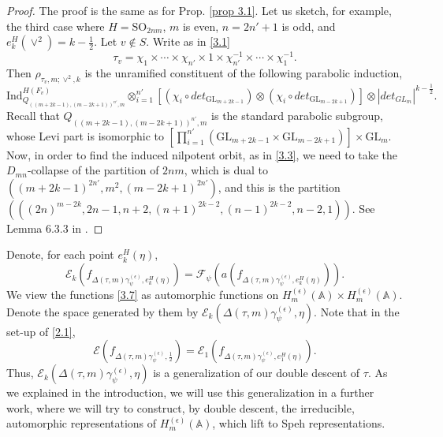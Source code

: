 \documentclass[12pts]{amsart}
\newcommand{\BA}{{\mathbb {A}}}
\newcommand{\GL}{{\mathrm{GL}}}
\newcommand{\Ind}{{\mathrm{Ind}}}
\newcommand{\SO}{{\mathrm{SO}}}
\begin{document}
\begin{proof}
The proof is the same as for Prop. \ref{prop 3.1}. Let us sketch, for example, the third case where $H=\SO_{2nm}$, $m$ is even, $n=2n'+1$ is odd, and $e_k^H(\vee^2)=k-\frac{1}{2}$. Let $v\notin S$. Write as in \eqref{3.1}
\begin{equation}\label{3.5}
\tau_v=\chi_1\times\cdots\times \chi_{n'}\times 1\times\chi^{-1}_{n'}\times\cdots\times\chi^{-1}_1.
\end{equation}
Then $\rho_{\tau_v,m;\vee^2,k}$ is the unramified constituent of the following parabolic induction, 
\begin{equation}\label{3.6}
\Ind^{H(F_v)}_{Q_{((m+2k-1),(m-2k+1))^{n'},m}}\otimes_{i=1}^{n'}[(\chi_i\circ det_{\GL_{m+2k-1}}) \otimes (\chi_i\circ det_{\GL_{m-2k+1}})]\otimes |det_{GL_m}|^{k-\frac{1}{2}}.
\end{equation}
Recall that $Q_{((m+2k-1),(m-2k+1))^{n'},m}$ is the standard parabolic subgroup, whose Levi part is isomorphic to $[\prod_{i=1}^{n'} (\GL_{m+2k-1}\times \GL_{m-2k+1})]\times \GL_m$. Now, in order to find the induced nilpotent orbit, as in \eqref{3.3}, we need to take the $D_{mn}$-collapse of the partition of $2nm$, which is dual to $((m+2k-1)^{2n'},m^2,(m-2k+1)^{2n'})$, and this is the partition 
$(((2n)^{m-2k}, 2n-1, n+2, (n+1)^{2k-2}, (n-1)^{2k-2}, n-2,1))$. See Lemma 6.3.3 in \cite{CM93}.
\end{proof}
Denote, for each point $e^H_k(\eta)$,
\begin{equation}\label{3.7}
\mathcal{E}_k(f_{\Delta(\tau,m)\gamma^{(\epsilon)}_\psi,e^H_k(\eta)})=
\mathcal{F}_\psi(a(f_{\Delta(\tau,m)\gamma^{(\epsilon)}_\psi,e^H_k(\eta)})).
\end{equation}
We view the functions \eqref{3.7} as automorphic functions on $H_m^{(\epsilon)}(\BA)\times H_m^{(\epsilon)}(\BA)$. Denote the space generated by them by $\mathcal{E}_k(\Delta(\tau,m)\gamma_\psi^{(\epsilon)},\eta)$.
Note that in the set-up of \eqref{2.1},
\begin{equation}\label{3.8}
\mathcal{E}(f_{\Delta(\tau,m)\gamma^{(\epsilon)}_\psi,\frac{1}{2}})=\mathcal{E}_1(f_{\Delta(\tau,m)\gamma^{(\epsilon)}_\psi,e^H_1(\eta)}).
\end{equation}
Thus, $\mathcal{E}_k(\Delta(\tau,m)\gamma_\psi^{(\epsilon)},\eta)$ is a generalization of our double descent of $\tau$. As we explained in the introduction, we will use this generalization in a further work, where we will try to construct, by double descent, the irreducible, automorphic representations of $H_m^{(\epsilon)}(\BA)$, which lift to Speh representations.
\end{document}
